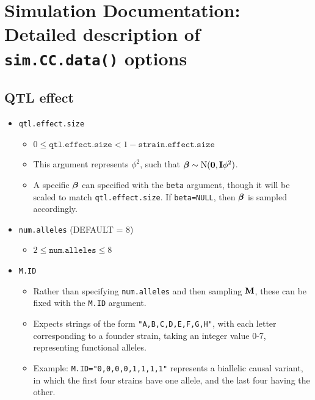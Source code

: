 \section{Simulation Documentation: Detailed description of \texttt{sim.CC.data()} options}

\subsection{QTL effect}

\begin{itemize}
	\item \texttt{qtl.effect.size}
    \begin{itemize}
    	\item $0 \le \texttt{qtl.effect.size} < 1 - \texttt{strain.effect.size}$ 
    	\item This argument represents $\phi^{2}$, such that $\boldsymbol{\beta} \sim \text{N}(\mathbf{0}, \mathbf{I}\phi^{2})$. 
        \item A specific $\boldsymbol{\beta}$ can specified with the \texttt{beta} argument, though it will be scaled to match \texttt{qtl.effect.size}. If \texttt{beta=NULL}, then $\boldsymbol{\beta}$ is sampled accordingly.
    \end{itemize}
    
    \item \texttt{num.alleles} (DEFAULT = 8)
    \begin{itemize}
    	\item $2 \le \texttt{num.alleles} \le 8 $
    \end{itemize}
    
    \item \texttt{M.ID}
    \begin{itemize}
    	\item Rather than specifying \texttt{num.alleles} and then sampling $\mathbf{M}$, these can be fixed with the \texttt{M.ID} argument.
        \item Expects strings of the form \texttt{"A,B,C,D,E,F,G,H"}, with each letter corresponding to a founder strain, taking an integer value 0-7, representing functional alleles.
        \item Example: \texttt{M.ID="0,0,0,0,1,1,1,1"} represents a biallelic causal variant, in which the first four strains have one allele, and the last four having the other.
    \end{itemize}


\end{itemize}
